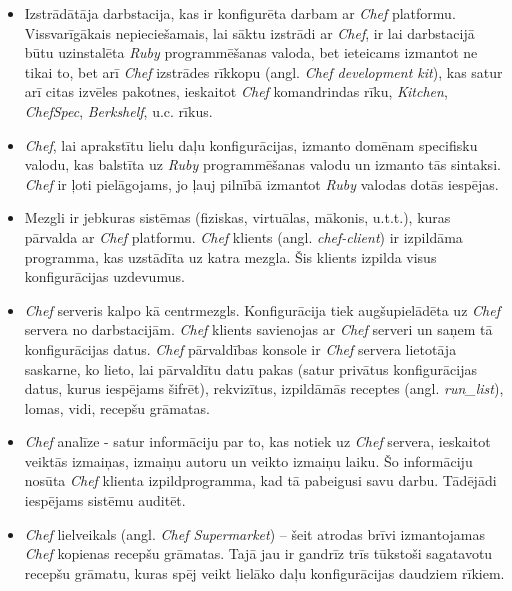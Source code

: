 \begin{itemize}
	\item Izstrādātāja darbstacija, kas ir konfigurēta darbam ar \textit{Chef} platformu. Vissvarīgākais nepieciešamais, lai sāktu izstrādi ar \textit{Chef}, ir lai darbstacijā būtu uzinstalēta \textit{Ruby} programmēšanas valoda, bet ieteicams izmantot ne tikai to, bet arī \textit{Chef} izstrādes rīkkopu (angl. \textit{Chef development kit}), kas satur arī citas izvēles pakotnes, ieskaitot \textit{Chef} komandrindas rīku, \textit{Kitchen}, \textit{ChefSpec}, \textit{Berkshelf}, u.c. rīkus.
	\item \textit{Chef}, lai aprakstītu lielu daļu konfigurācijas, izmanto domēnam specifisku valodu, kas balstīta uz \textit{Ruby} programmēšanas valodu un izmanto tās sintaksi. \textit{Chef} ir ļoti pielāgojams, jo ļauj pilnībā izmantot \textit{Ruby} valodas dotās iespējas.
	\item Mezgli ir jebkuras sistēmas (fiziskas, virtuālas, mākonis, u.t.t.), kuras pārvalda ar \textit{Chef} platformu. \textit{Chef} klients (angl. \textit{chef-client}) ir izpildāma programma, kas uzstādīta uz katra mezgla. Šis klients izpilda visus konfigurācijas uzdevumus.
	\item \textit{Chef} serveris kalpo kā centrmezgls. Konfigurācija tiek augšupielādēta uz \textit{Chef} servera no darbstacijām. \textit{Chef} klients savienojas ar \textit{Chef} serveri un saņem tā konfigurācijas datus.
	\textit{Chef} pārvaldības konsole ir \textit{Chef} servera lietotāja saskarne, ko lieto, lai pārvaldītu datu pakas (satur privātus konfigurācijas datus, kurus iespējams šifrēt), rekvizītus, izpildāmās receptes (angl. \textit{run_list}), lomas, vidi, recepšu grāmatas.
	\item \textit{Chef} analīze - satur informāciju par to, kas notiek uz \textit{Chef} servera, ieskaitot veiktās izmaiņas, izmaiņu autoru un veikto izmaiņu laiku. Šo informāciju nosūta \textit{Chef} klienta izpildprogramma, kad tā pabeigusi savu darbu. Tādējādi iespējams sistēmu auditēt.
	\item \textit{Chef} lielveikals (angl. \textit{Chef Supermarket}) -- šeit atrodas brīvi izmantojamas \textit{Chef} kopienas recepšu grāmatas. Tajā jau ir gandrīz trīs tūkstoši sagatavotu recepšu grāmatu, kuras spēj veikt lielāko daļu konfigurācijas daudziem rīkiem.
\end{itemize}



